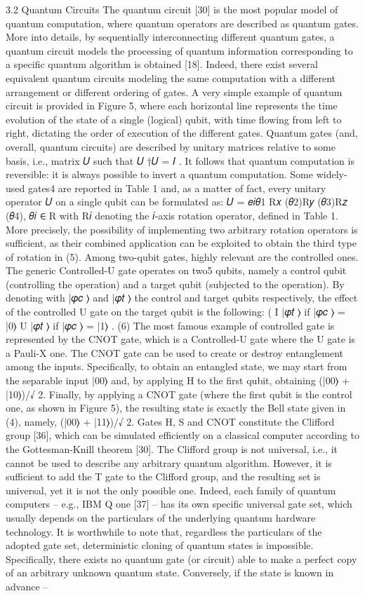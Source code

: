 3.2 Quantum Circuits The quantum circuit [30] is the most popular model of quantum computation, where quantum operators are described as quantum gates. More into details, by sequentially interconnecting different quantum gates, a quantum circuit models the processing of quantum information corresponding to a specific quantum algorithm is obtained [18]. Indeed, there exist several equivalent quantum circuits modeling the same computation with a different arrangement or different ordering of gates. A very simple example of quantum circuit is provided in Figure 5, where each horizontal line represents the time evolution of the state of a single (logical) qubit, with time flowing from left to right, dictating the order of execution of the different gates. Quantum gates (and, overall, quantum circuits) are described by unitary matrices relative to some basis, i.e., matrix 𝑈 such that 𝑈 †𝑈 = 𝐼 . It follows that quantum computation is reversible: it is always possible to invert a quantum computation. Some widely-used gates4 are reported in Table 1 and, as a matter of fact, every unitary operator 𝑈 on a single qubit can be formulated as: 𝑈 = 𝑒𝑖𝜃1 R𝑥 (𝜃2)R𝑦 (𝜃3)R𝑧 (𝜃4), 𝜃𝑖 ∈ R with R𝑖 denoting the 𝑖-axis rotation operator, defined in Table 1. More precisely, the possibility of implementing two arbitrary rotation operators is sufficient, as their combined application can be exploited to obtain the third type of rotation in (5). Among two-qubit gates, highly relevant are the controlled ones. The generic Controlled-U gate operates on two5 qubits, namely a control qubit (controlling the operation) and a target qubit (subjected to the operation). By denoting with |𝜑𝑐 ⟩ and |𝜑𝑡 ⟩ the control and target qubits respectively, the effect of the controlled U gate on the target qubit is the following: ( I |𝜑𝑡 ⟩ if |𝜑𝑐 ⟩ = |0⟩ U |𝜑𝑡 ⟩ if |𝜑𝑐 ⟩ = |1⟩ . (6) The most famous example of controlled gate is represented by the CNOT gate, which is a Controlled-U gate where the U gate is a Pauli-X one. The CNOT gate can be used to create or destroy entanglement among the inputs. Specifically, to obtain an entangled state, we may start from the separable input |00⟩ and, by applying H to the first qubit, obtaining (|00⟩ + |10⟩)/√ 2. Finally, by applying a CNOT gate (where the first qubit is the control one, as shown in Figure 5), the resulting state is exactly the Bell state given in (4), namely, (|00⟩ + |11⟩)/√ 2. Gates H, S and CNOT constitute the Clifford group [36], which can be simulated efficiently on a classical computer according to the Gottesman-Knill theorem [30]. The Clifford group is not universal, i.e., it cannot be used to describe any arbitrary quantum algorithm. However, it is sufficient to add the T gate to the Clifford group, and the resulting set is universal, yet it is not the only possible one. Indeed, each family of quantum computers – e.g., IBM Q one [37] – has its own specific universal gate set, which usually depends on the particulars of the underlying quantum hardware technology. It is worthwhile to note that, regardless the particulars of the adopted gate set, deterministic cloning of quantum states is impossible. Specifically, there exists no quantum gate (or circuit) able to make a perfect copy of an arbitrary unknown quantum state. Conversely, if the state is known in advance – 